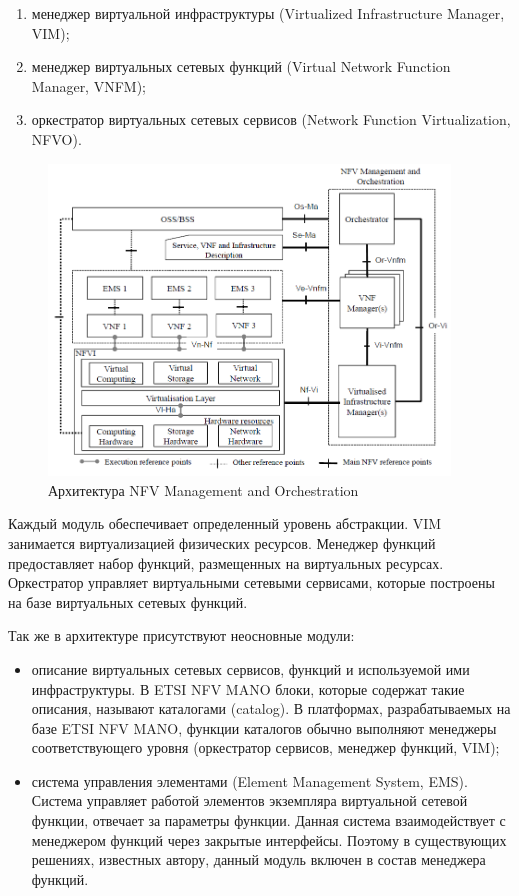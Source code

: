 \documentclass[oneside,final,14pt,a4paper]{extreport}
\begin{document}
\begin{enumerate}
	\item менеджер виртуальной инфраструктуры (Virtualized Infrastructure Manager, VIM);
	\item менеджер виртуальных сетевых функций (Virtual Network Function Manager, VNFM);
	\item оркестратор виртуальных сетевых сервисов (Network Function Virtualization, NFVO).
\end{enumerate}

\begin{figure}[h]
	\centering
	\includegraphics[width=0.95\textwidth]{nfv-mano}
	\caption{Архитектура NFV Management and Orchestration}
	\label{nfv-mano-image1}
\end{figure}

Каждый модуль обеспечивает определенный уровень абстракции. VIM занимается виртуализацией физических ресурсов. Менеджер функций предоставляет набор функций, размещенных на виртуальных ресурсах. Оркестратор управляет виртуальными сетевыми сервисами, которые построены на базе виртуальных сетевых функций.

Так же в архитектуре присутствуют неосновные модули:
\begin{itemize}
	\item описание виртуальных сетевых сервисов, функций и используемой ими инфраструктуры. В ETSI NFV MANO блоки, которые содержат такие описания, называют каталогами (catalog). В платформах, разрабатываемых на базе ETSI NFV MANO, функции каталогов обычно выполняют менеджеры соответствующего уровня (оркестратор сервисов, менеджер функций, VIM);
	\item система управления элементами (Element Management System, EMS). Система управляет работой элементов экземпляра виртуальной сетевой функции, отвечает за параметры функции. Данная система взаимодействует с менеджером функций через закрытые интерфейсы. Поэтому в существующих решениях, известных автору, данный модуль включен в состав менеджера функций.
\end{itemize}
\end{document}
